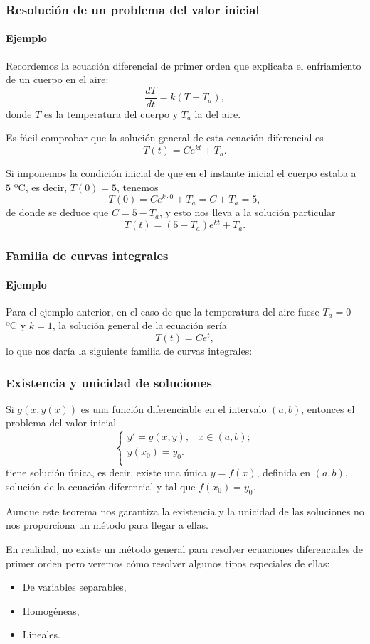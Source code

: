 \begin{frame}
\frametitle{Resolución de un problema del valor inicial}
\framesubtitle{Ejemplo}
Recordemos la ecuación diferencial de primer orden que explicaba el enfriamiento de un cuerpo en el aire:
\[
\frac{dT}{dt}=k(T-T_a),
\]
donde $T$ es la temperatura del cuerpo y $T_a$ la del aire.

Es fácil comprobar que la solución general de esta ecuación diferencial es 
\[T(t) = Ce^{kt}+T_a.\]

Si imponemos la condición inicial de que en el instante inicial el cuerpo estaba a $5$ ºC, es decir, $T(0)=5$, tenemos 
\[T(0) = Ce^{k\cdot0}+T_a = C+T_a = 5,\]
de donde se deduce que $C=5-T_a$, y esto nos lleva a la solución particular 
\[
T(t) = (5-T_a)e^{kt}+T_a.
\]
\end{frame}


\begin{frame}
\frametitle{Familia de curvas integrales}
\framesubtitle{Ejemplo}
Para el ejemplo anterior, en el caso de que la temperatura del aire fuese $T_a=0$ ºC y $k=1$, la solución general de la ecuación sería 
\[T(t)=Ce^t,\]
lo que nos daría la siguiente familia de curvas integrales:
\begin{center}
\scalebox{0.95}{}
\end{center}
\end{frame}


\begin{frame}
\frametitle{Existencia y unicidad de soluciones}
\begin{teorema}
Si $g(x,y(x))$ es una función diferenciable en el intervalo $(a,b)$, entonces el problema del valor inicial
\[
\left\{%
\begin{array}{ll}
    y'=g(x,y), & x\in (a,b); \\
    y(x_0)=y_0.\\
\end{array}%
\right.
\]   
tiene solución única, es decir, existe una única $y=f(x)$, definida en $(a,b)$, solución de la ecuación diferencial y tal que $f(x_0)=y_0$.
\end{teorema}

Aunque este teorema nos garantiza la existencia y la unicidad de las soluciones no nos proporciona un método para llegar a ellas.

En realidad, no existe un método general para resolver ecuaciones diferenciales de primer orden pero veremos cómo resolver algunos tipos especiales de ellas:
\begin{itemize}
\item De variables separables,
\item Homogéneas,
\item Lineales.
\end{itemize}
\end{frame}



